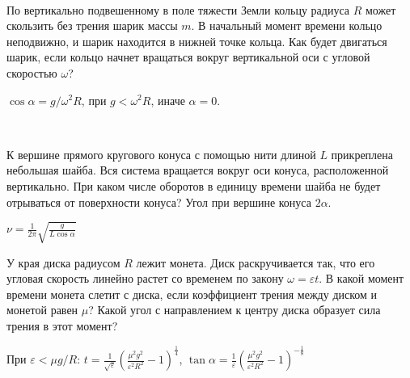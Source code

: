 \begin{ex}
\hspace{0pt} \\
\begin{minipage}{.65\textwidth}
По вертикально подвешенному в поле тяжести Земли кольцу радиуса $R$ может скользить без трения шарик массы $m$. 
В начальный момент времени кольцо неподвижно, и шарик находится в нижней точке кольца. 
Как будет двигаться шарик, если кольцо начнет вращаться вокруг вертикальной оси с угловой скоростью $\omega$?
\end{minipage}
\begin{minipage}{.35\textwidth}
\centering

\end{minipage}
\begin{ans}
$\cos \alpha = g/\omega^2 R$, при $g < \omega^2 R$, иначе $\alpha = 0$.
\end{ans}
\end{ex}

\begin{ex}
\hspace{0pt} \\
\begin{minipage}{.65\textwidth}
К вершине прямого кругового конуса с помощью нити длиной $L$ прикреплена небольшая шайба. Вся система вращается вокруг оси конуса, расположенной вертикально. При каком числе оборотов в единицу времени шайба не будет отрываться от поверхности конуса? Угол при вершине конуса $2\alpha$.
\end{minipage}
\begin{minipage}{.35\textwidth}
\centering

\end{minipage}
\begin{ans}
$\nu = \frac{1}{2\pi}\sqrt{\frac{g}{L \cos \alpha}}$
\end{ans}
\end{ex}

\begin{ex}
У края диска радиусом $R$ лежит монета. Диск раскручивается так, что его угловая скорость линейно растет со временем по закону $\omega = \varepsilon t$.  В какой момент времени монета слетит с диска, если коэффициент трения между диском и монетой равен $\mu$? Какой угол с направлением к центру диска образует сила трения в этот момент?
\begin{ans}
При $\varepsilon < \mu g /R$: $t=\frac{1}{\sqrt{\varepsilon}}\left( \frac{\mu^2 g^2}{\varepsilon^2 R^2} - 1 \right)^{\frac{1}{4}}$, $\tan \alpha = \frac{1}{\varepsilon}\left( \frac{\mu^2 g^2}{\varepsilon^2 R^2} - 1 \right)^{-\frac{1}{8}}$
\end{ans}
\end{ex}

